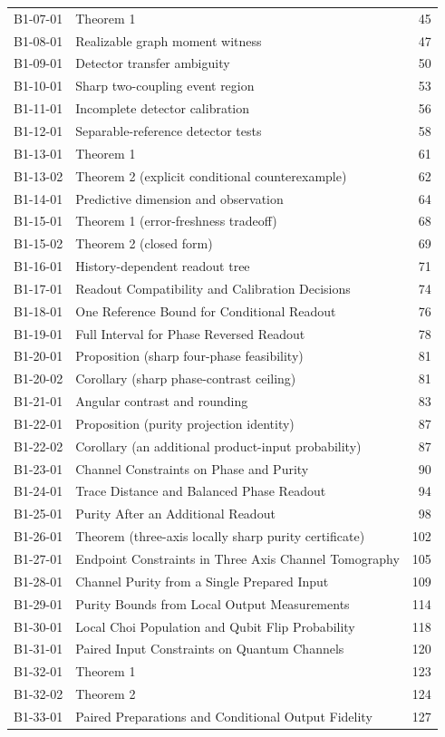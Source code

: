 \documentclass[11pt,a4paper]{article}
\begin{document}
{\begin{longtable}{@{}l>{\raggedright\arraybackslash}p{}r@{}}
B1-07-01 & Theorem 1 & 45\\
B1-08-01 & Realizable graph moment witness & 47\\
B1-09-01 & Detector transfer ambiguity & 50\\
B1-10-01 & Sharp two-coupling event region & 53\\
B1-11-01 & Incomplete detector calibration & 56\\
B1-12-01 & Separable-reference detector tests & 58\\
B1-13-01 & Theorem 1 & 61\\
B1-13-02 & Theorem 2 (explicit conditional counterexample) & 62\\
B1-14-01 & Predictive dimension and observation & 64\\
B1-15-01 & Theorem 1 (error-freshness tradeoff) & 68\\
B1-15-02 & Theorem 2 (closed form) & 69\\
B1-16-01 & History-dependent readout tree & 71\\
B1-17-01 & Readout Compatibility and Calibration Decisions & 74\\
B1-18-01 & One Reference Bound for Conditional Readout & 76\\
B1-19-01 & Full Interval for Phase Reversed Readout & 78\\
B1-20-01 & Proposition (sharp four-phase feasibility) & 81\\
B1-20-02 & Corollary (sharp phase-contrast ceiling) & 81\\
B1-21-01 & Angular contrast and rounding & 83\\
B1-22-01 & Proposition (purity projection identity) & 87\\
B1-22-02 & Corollary (an additional product-input probability) & 87\\
B1-23-01 & Channel Constraints on Phase and Purity & 90\\
B1-24-01 & Trace Distance and Balanced Phase Readout & 94\\
B1-25-01 & Purity After an Additional Readout & 98\\
B1-26-01 & Theorem (three-axis locally sharp purity certificate) & 102\\
B1-27-01 & Endpoint Constraints in Three Axis Channel Tomography & 105\\
B1-28-01 & Channel Purity from a Single Prepared Input & 109\\
B1-29-01 & Purity Bounds from Local Output Measurements & 114\\
B1-30-01 & Local Choi Population and Qubit Flip Probability & 118\\
B1-31-01 & Paired Input Constraints on Quantum Channels & 120\\
B1-32-01 & Theorem 1 & 123\\
B1-32-02 & Theorem 2 & 124\\
B1-33-01 & Paired Preparations and Conditional Output Fidelity & 127\\
\bottomrule\end{longtable}}
\end{document}
